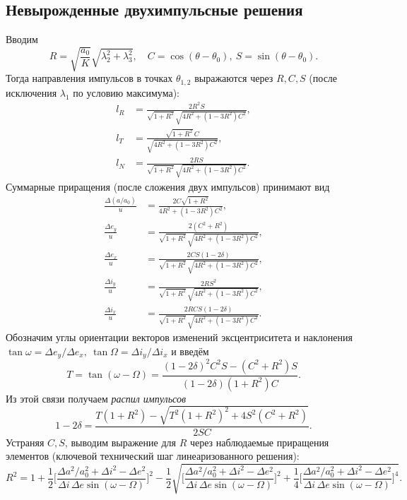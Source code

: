 \documentclass[12pt,a4paper]{article}
\begin{document}
\subsection{Невырожденные двухимпульсные решения}
Вводим
\begin{equation}
R=\sqrt{\frac{a_0}{K}}\sqrt{\lambda_2^2+\lambda_3^2},\quad
C=\cos(\theta-\theta_0),\ S=\sin(\theta-\theta_0).
\end{equation}
Тогда направления импульсов в точках $\theta_{1,2}$ выражаются через $R,C,S$ (после исключения $\lambda_1$ по условию максимума):
\begin{align}
l_R &= \frac{2R^2 S}{\sqrt{1+R^2}\,\sqrt{4R^2+(1-3R^2)C^2}},\\
l_T &= \frac{\sqrt{1+R^2}\,C}{\sqrt{4R^2+(1-3R^2)C^2}},\\
l_N &= \frac{2RS}{\sqrt{1+R^2}\,\sqrt{4R^2+(1-3R^2)C^2}}.
\end{align}
Суммарные приращения (после сложения двух импульсов) принимают вид
\begin{align}
\frac{\Delta (a/a_0)}{u} &= \frac{2C\sqrt{1+R^2}}{4R^2+(1-3R^2)C^2},\\
\frac{\Delta e_y}{u} &= \frac{2(C^2+R^2)}{\sqrt{1+R^2}\,\sqrt{4R^2+(1-3R^2)C^2}},\\
\frac{\Delta e_x}{u} &= \frac{2CS(1-2\delta)}{\sqrt{1+R^2}\,\sqrt{4R^2+(1-3R^2)C^2}},\\
\frac{\Delta i_y}{u} &= \frac{2RS^2}{\sqrt{1+R^2}\,\sqrt{4R^2+(1-3R^2)C^2}},\\
\frac{\Delta i_x}{u} &= \frac{2RCS(1-2\delta)}{\sqrt{1+R^2}\,\sqrt{4R^2+(1-3R^2)C^2}}.
\end{align}
Обозначим углы ориентации векторов изменений эксцентриситета и наклонения
\(
\tan\omega=\Delta e_y/\Delta e_x,\ 
\tan\Omega=\Delta i_y/\Delta i_x
\)
и введём
\begin{equation}
T=\tan(\omega-\Omega)=\frac{(1-2\delta)^2 C^2 S-(C^2+R^2)S}{(1-2\delta)(1+R^2)C}.
\end{equation}
Из этой связи получаем \emph{распил импульсов}
\begin{equation}
1-2\delta=\frac{T(1+R^2)-\sqrt{T^2(1+R^2)^2+4S^2(C^2+R^2)}}{2SC}.
\end{equation}
Устраняя $C,S$, выводим выражение для $R$ через наблюдаемые приращения элементов (ключевой технический шаг линеаризованного решения):
\begin{equation}
R^2=1+\frac12\Biggl[\frac{\Delta a^2/a_0^2+\Delta i^2-\Delta e^2}{\Delta i\,\Delta e \sin(\omega-\Omega)}\Biggr]^2-\frac12
\sqrt{\Biggl[\frac{\Delta a^2/a_0^2+\Delta i^2-\Delta e^2}{\Delta i\,\Delta e \sin(\omega-\Omega)}\Biggr]^2+\frac14\Biggl[\frac{\Delta a^2/a_0^2+\Delta i^2-\Delta e^2}{\Delta i\,\Delta e \sin(\omega-\Omega)}\Biggr]^4 }.
\end{equation}
\end{document}
